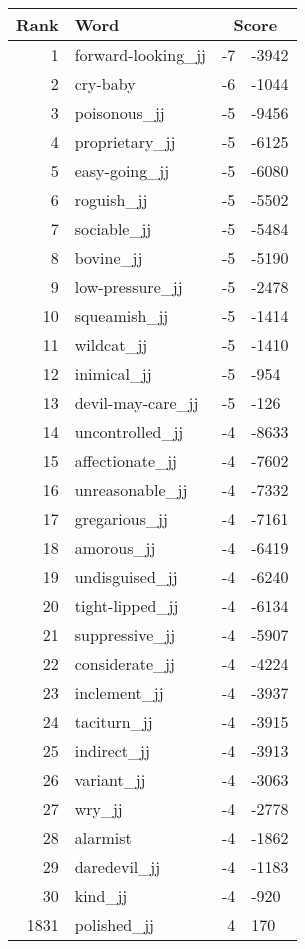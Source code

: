 \begin{longtable}[!htbp]{| rlr@{.}l |}
    \hline
    \textbf{Rank} & \textbf{Word} & \multicolumn{2}{c|}{\textbf{Score}} \\
    \hline
    \endhead
    1 & forward-looking\_jj & -7 & -3942 \\
    2 & cry-baby & -6 & -1044 \\
    3 & poisonous\_jj & -5 & -9456 \\
    4 & proprietary\_jj & -5 & -6125 \\
    5 & easy-going\_jj & -5 & -6080 \\
    6 & roguish\_jj & -5 & -5502 \\
    7 & sociable\_jj & -5 & -5484 \\
    8 & bovine\_jj & -5 & -5190 \\
    9 & low-pressure\_jj & -5 & -2478 \\
    10 & squeamish\_jj & -5 & -1414 \\
    11 & wildcat\_jj & -5 & -1410 \\
    12 & inimical\_jj & -5 & -954 \\
    13 & devil-may-care\_jj & -5 & -126 \\
    14 & uncontrolled\_jj & -4 & -8633 \\
    15 & affectionate\_jj & -4 & -7602 \\
    16 & unreasonable\_jj & -4 & -7332 \\
    17 & gregarious\_jj & -4 & -7161 \\
    18 & amorous\_jj & -4 & -6419 \\
    19 & undisguised\_jj & -4 & -6240 \\
    20 & tight-lipped\_jj & -4 & -6134 \\
    21 & suppressive\_jj & -4 & -5907 \\
    22 & considerate\_jj & -4 & -4224 \\
    23 & inclement\_jj & -4 & -3937 \\
    24 & taciturn\_jj & -4 & -3915 \\
    25 & indirect\_jj & -4 & -3913 \\
    26 & variant\_jj & -4 & -3063 \\
    27 & wry\_jj & -4 & -2778 \\
    28 & alarmist & -4 & -1862 \\
    29 & daredevil\_jj & -4 & -1183 \\
    30 & kind\_jj & -4 & -920 \\
    1831 & polished\_jj & 4 & 170 \\

\end{longtable}
